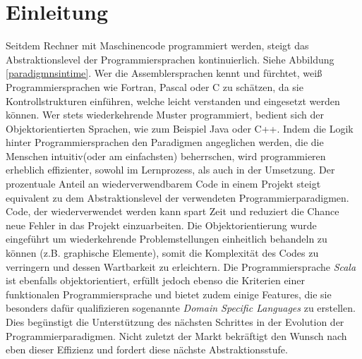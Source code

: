 
\chapter{Einleitung}
Seitdem Rechner mit Maschinencode programmiert werden, steigt das Abstraktionslevel der Programmiersprachen kontinuierlich. Siehe Abbildung \ref{paradigmnsintime}. Wer die Assemblersprachen kennt und fürchtet, weiß Programmiersprachen wie Fortran, Pascal oder C zu schätzen, da sie Kontrollstrukturen einführen, welche leicht verstanden und eingesetzt werden können. Wer stets wiederkehrende Muster programmiert, bedient sich der Objektorientierten Sprachen, wie zum Beispiel Java oder C++.
Indem die Logik hinter Programmiersprachen den Paradigmen angeglichen werden, die die Menschen intuitiv(oder am einfachsten) beherrschen, wird programmieren erheblich effizienter, sowohl im Lernprozess, als auch in der Umsetzung. 
Der prozentuale Anteil an wiederverwendbarem Code in einem Projekt steigt equivalent zu dem Abstraktionslevel der verwendeten Programmierparadigmen. Code, der wiederverwendet werden kann spart Zeit und reduziert die Chance neue Fehler in das Projekt einzuarbeiten. Die Objektorientierung wurde eingeführt um wiederkehrende Problemstellungen einheitlich behandeln zu können (z.B. graphische Elemente), somit die Komplexität des Codes zu verringern und dessen Wartbarkeit zu erleichtern. Die Programmiersprache \textit{Scala} ist ebenfalls objektorientiert, erfüllt jedoch ebenso die Kriterien einer funktionalen Programmiersprache und bietet zudem einige Features, die sie besonders dafür qualifizieren sogenannte \textit{Domain Specific Languages} zu erstellen. Dies begünstigt die Unterstützung des nächsten Schrittes in der Evolution der Programmierparadigmen. Nicht zuletzt der Markt bekräftigt den Wunsch nach eben dieser Effizienz und fordert diese nächste Abstraktionsstufe. 
